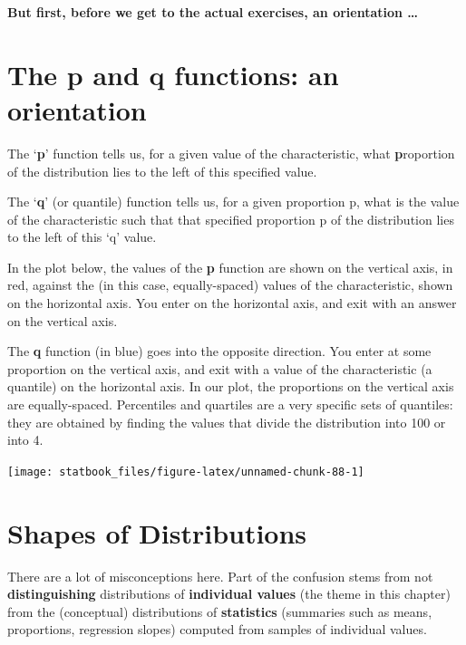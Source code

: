 \documentclass[]{book}
\begin{document}
\textbf{But first, before we get to the actual exercises, an orientation \ldots{}}

\hypertarget{the-p-and-q-functions-an-orientation}{%
\section{The p and q functions: an orientation}\label{the-p-and-q-functions-an-orientation}}

The `\textbf{p}' function tells us, for a given value of the characteristic, what \textbf{p}roportion of the distribution lies to the left of this specified value.

The `\textbf{q}' (or quantile) function tells us, for a given proportion p, what is the value of the characteristic such that that specified proportion p of the distribution lies to the left of this `q' value.

In the plot below, the values of the \textbf{p} function are shown on the vertical axis, in red, against the (in this case, equally-spaced) values of the characteristic, shown on the horizontal axis. You enter on the horizontal axis, and exit with an answer on the vertical axis.

The \textbf{q} function (in blue) goes into the opposite direction. You enter at some proportion on the vertical axis, and exit with a value of the characteristic (a quantile) on the horizontal axis. In our plot, the proportions on the vertical axis are equally-spaced. Percentiles and quartiles are a very specific sets of quantiles: they are obtained by finding the values that divide the distribution into 100 or into 4.

\begin{center}\texttt{[image: statbook\_files/figure-latex/unnamed-chunk-88-1]} \end{center}

\hypertarget{shapes-of-distributions}{%
\section{Shapes of Distributions}\label{shapes-of-distributions}}

There are a lot of misconceptions here. Part of the confusion stems from not \textbf{distinguishing} distributions of \textbf{individual values} (the theme in this chapter) from the (conceptual) distributions of \textbf{statistics} (summaries such as means, proportions, regression slopes) computed from samples of individual values.
\end{document}
